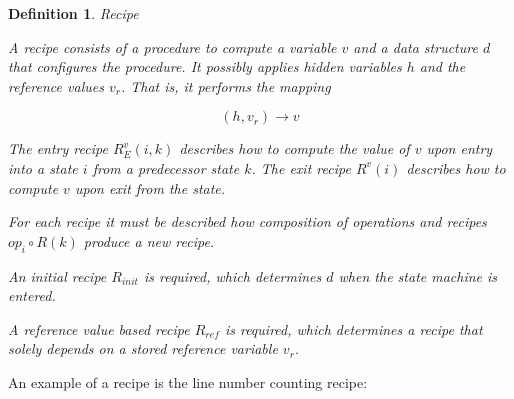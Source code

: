 \documentclass[12pt,a4paper]{scrartcl}
\newtheorem{definition}{Definition}
\begin{document}
\begin{definition} Recipe 

    A recipe consists of a procedure to compute a variable $v$ and a data
    structure $d$ that configures the procedure. It possibly applies hidden
    variables $h$ and the reference values $v_r$. That is, it performs the
    mapping

    \begin{equation} \label{eq:recipe-procedure}
        (h, v_r) \rightarrow v 
    \end{equation}

    The entry recipe $R^v_E(i,k)$ describes how to compute the value of $v$ upon
    entry into a state $i$ from a predecessor state $k$. The exit recipe 
    $R^v(i)$ describes how to compute $v$ upon exit from the state.

    For each recipe it must be described how composition of operations and
    recipes $op_i\circ R(k)$ produce a new recipe. 

    An initial recipe $R_{init}$ is required, which determines $d$ when the
    state machine is entered. 

    A reference value based recipe $R_{ref}$ is required, which determines
    a recipe that solely depends on a stored reference variable $v_r$.

\end{definition}

An example of a recipe is the line number counting recipe:
\end{document}
